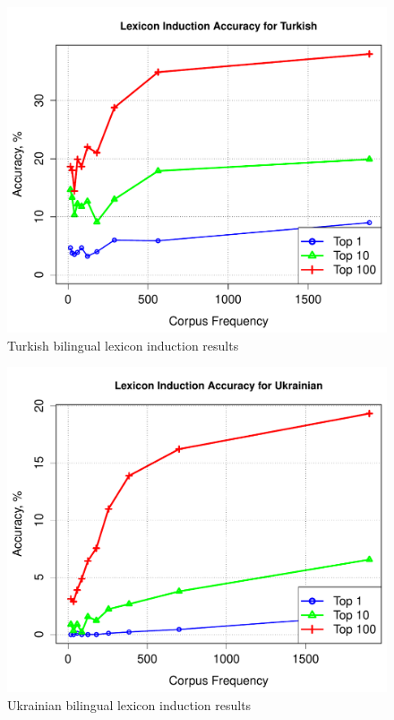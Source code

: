 \documentclass[11pt]{article}
\begin{document}
\begin{figure}
\begin{center}
\includegraphics[width=0.9 \linewidth]{../byFreqGraphs/tr/lexinductnew.pdf}
\vskip -0.15in
\caption{Turkish bilingual lexicon induction results}
\label{fig:bli.tr} 
\end{center}
\end{figure}



\begin{figure}
\begin{center}
\includegraphics[width=0.9 \linewidth]{../byFreqGraphs/uk/lexinductnew.pdf}
\vskip -0.15in
\caption{Ukrainian bilingual lexicon induction results}
\label{fig:bli.uk} 
\end{center}
\end{figure}
\end{document}
